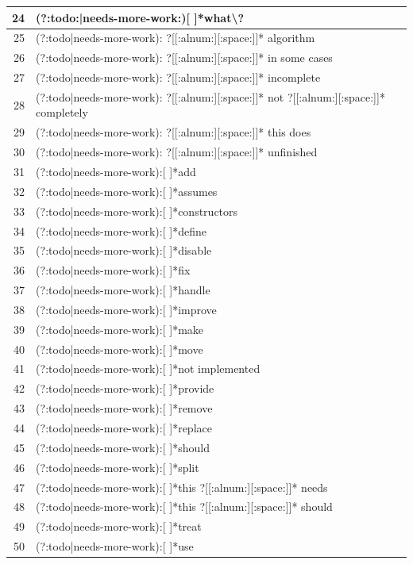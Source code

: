 \documentclass[
]{article}
\begin{document}
\begin{longtable}{r|l}
\hline
24 & (?:todo:|needs-more-work:)[ ]*what\textbackslash{}?\\
\hline
25 & (?:todo|needs-more-work): ?[[:alnum:][:space:]]* algorithm\\
\hline
26 & (?:todo|needs-more-work): ?[[:alnum:][:space:]]* in some cases\\
\hline
27 & (?:todo|needs-more-work): ?[[:alnum:][:space:]]* incomplete\\
\hline
28 & (?:todo|needs-more-work): ?[[:alnum:][:space:]]* not ?[[:alnum:][:space:]]* completely\\
\hline
29 & (?:todo|needs-more-work): ?[[:alnum:][:space:]]* this does\\
\hline
30 & (?:todo|needs-more-work): ?[[:alnum:][:space:]]* unfinished\\
\hline
31 & (?:todo|needs-more-work):[ ]*add\\
\hline
32 & (?:todo|needs-more-work):[ ]*assumes\\
\hline
33 & (?:todo|needs-more-work):[ ]*constructors\\
\hline
34 & (?:todo|needs-more-work):[ ]*define\\
\hline
35 & (?:todo|needs-more-work):[ ]*disable\\
\hline
36 & (?:todo|needs-more-work):[ ]*fix\\
\hline
37 & (?:todo|needs-more-work):[ ]*handle\\
\hline
38 & (?:todo|needs-more-work):[ ]*improve\\
\hline
39 & (?:todo|needs-more-work):[ ]*make\\
\hline
40 & (?:todo|needs-more-work):[ ]*move\\
\hline
41 & (?:todo|needs-more-work):[ ]*not implemented\\
\hline
42 & (?:todo|needs-more-work):[ ]*provide\\
\hline
43 & (?:todo|needs-more-work):[ ]*remove\\
\hline
44 & (?:todo|needs-more-work):[ ]*replace\\
\hline
45 & (?:todo|needs-more-work):[ ]*should\\
\hline
46 & (?:todo|needs-more-work):[ ]*split\\
\hline
47 & (?:todo|needs-more-work):[ ]*this ?[[:alnum:][:space:]]* needs\\
\hline
48 & (?:todo|needs-more-work):[ ]*this ?[[:alnum:][:space:]]* should\\
\hline
49 & (?:todo|needs-more-work):[ ]*treat\\
\hline
50 & (?:todo|needs-more-work):[ ]*use\\

\end{longtable}
\end{document}
